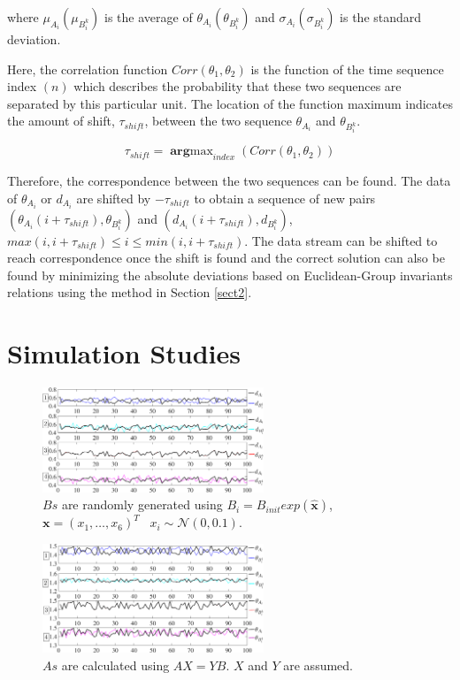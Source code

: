 \documentclass[letterpaper, 10 pt, conference]{ieeeconf}  %
\begin{document}
where $\mu_{A_{i}}(\mu_{B_{i}^{k}})$ is the average of $\theta_{A_{i}}(\theta_{B_{i}^{k}})$ and $\sigma_{A_{i}}(\sigma_{B_{i}^{k}})$ is the standard deviation.

Here, the correlation function $Corr(\theta_{1},\theta_{2})$  is the function of the time sequence index $(n)$ which describes the probability that these two sequences are separated by this particular unit. The location of the function maximum indicates the amount of shift, $\tau_{shift}$, between the two sequence $\theta_{A_{i}}$ and $\theta_{B_{i}^{k}}$.

\begin{equation}\label{equ27}
    \tau_{shift} = \mathop{\mathbf{arg}max}_{index}(Corr(\theta_{1},\theta_{2}))
\end{equation}

Therefore, the correspondence between the two sequences can be found. The data of $\theta_{A_{i}}$ or $d_{A_{i}}$ are shifted by $-\tau_{shift}$ to obtain a sequence of new pairs $(\theta_{A_{i}}(i+\tau_{shift}),\theta_{B_{i}^{k}})$ and $(d_{A_{i}}(i+\tau_{shift}),d_{B_{i}^{k}})$, $max(i,i+\tau_{shift})\leq i \leq min(i,i+\tau_{shift})$. The data stream can be shifted to reach correspondence once the shift is found and the correct solution can also be found by minimizing the absolute deviations based on Euclidean-Group invariants relations using the method in Section \ref{sect2}.


\section{Simulation Studies}
\label{sect4}

\begin{center}
\begin{figure}
\centering
\includegraphics[width=2.6in]{fig3.eps}
\caption{
$Bs$ are randomly generated using  $B_i=B_{init}exp(\widehat{\mathbf{x}})$,$\mathbf{x}=(x_1,\dots,x_6)^T $ \ $x_i \sim \mathcal{N}(0,0.1)$.
}
\label{fig2}
\end{figure}
\end{center}

\begin{figure}
\centering
\includegraphics[width=2.6in,bb=84 202 501 581]{fig2.eps}
\caption{
$As$ are calculated using $AX=YB$. $X$ and $Y$ are assumed.
}
\label{fig3}
\end{figure}
\end{document}
